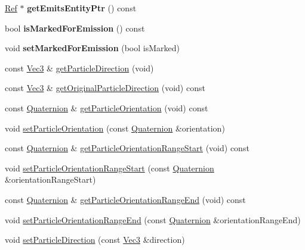 \begin{DoxyCompactItemize}
\item 
\mbox{\label{classPUEmitter_a0946ce78fd9a9b2e8b769031f5b9df05}} 
\hyperlink{classRef}{Ref} $\ast$ {\bfseries get\+Emits\+Entity\+Ptr} () const
\item 
\mbox{\label{classPUEmitter_a5526e10e83497b74af1d24f15a854192}} 
bool {\bfseries is\+Marked\+For\+Emission} () const
\item 
\mbox{\label{classPUEmitter_a588139d063d1db43370d8b162b04a5d6}} 
void {\bfseries set\+Marked\+For\+Emission} (bool is\+Marked)
\item 
const \hyperlink{classVec3}{Vec3} \& \hyperlink{classPUEmitter_a9729a55ab2476e508a018f34a3e9992f}{get\+Particle\+Direction} (void)
\item 
const \hyperlink{classVec3}{Vec3} \& \hyperlink{classPUEmitter_a5aa4fee283774f08aeec5159f492dd8a}{get\+Original\+Particle\+Direction} (void) const
\item 
const \hyperlink{classQuaternion}{Quaternion} \& \hyperlink{classPUEmitter_aa0b58409ec93a9c859bce86313865582}{get\+Particle\+Orientation} (void) const
\item 
void \hyperlink{classPUEmitter_ab71781433c3f2547008a71de464d615a}{set\+Particle\+Orientation} (const \hyperlink{classQuaternion}{Quaternion} \&orientation)
\item 
const \hyperlink{classQuaternion}{Quaternion} \& \hyperlink{classPUEmitter_a6a75ac2d65a56cb29d8bca44d3381e29}{get\+Particle\+Orientation\+Range\+Start} (void) const
\item 
void \hyperlink{classPUEmitter_a1832a77324bd2c4097d29d8789b27e33}{set\+Particle\+Orientation\+Range\+Start} (const \hyperlink{classQuaternion}{Quaternion} \&orientation\+Range\+Start)
\item 
const \hyperlink{classQuaternion}{Quaternion} \& \hyperlink{classPUEmitter_aa06b1807bea7964ff2221aacdac23f85}{get\+Particle\+Orientation\+Range\+End} (void) const
\item 
void \hyperlink{classPUEmitter_a4268d9ade8a9ff890397a2c74b0128b8}{set\+Particle\+Orientation\+Range\+End} (const \hyperlink{classQuaternion}{Quaternion} \&orientation\+Range\+End)
\item 
void \hyperlink{classPUEmitter_a999914161830d3b6cc2cbb6833f196af}{set\+Particle\+Direction} (const \hyperlink{classVec3}{Vec3} \&direction)
\item 

\end{DoxyCompactItemize}

